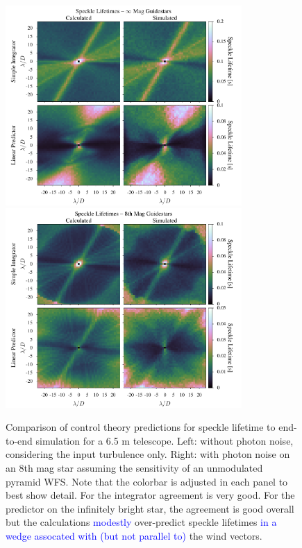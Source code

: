 \documentclass[10pt,preprint]{aastex631}
\newcommand{\jrmadd}[1]{\textcolor{blue}{#1}}
\begin{document}
\begin{figure}
\hspace{-0.3in}
\includegraphics[width=3.54in]{lifetimes0mag.pdf}
\includegraphics[width=3.54in]{lifetimes8mag.pdf}
\caption{Comparison of control theory predictions for speckle lifetime to end-to-end simulation for a 6.5 m telescope.  Left: without photon noise, considering the input turbulence only.  Right: with photon noise on an 8th mag star assuming the sensitivity of an unmodulated pyramid WFS. Note that the colorbar is adjusted in each panel to best show detail. For the integrator agreement is very good.  For the predictor on the infinitely bright star, the agreement is good overall but the calculations \jrmadd{modestly} over-predict speckle lifetimes \jrmadd{in a wedge assocated with (but not parallel to)} the wind vectors.  \label{fig:lifetime_2Dcomp}}
\end{figure}
\end{document}
